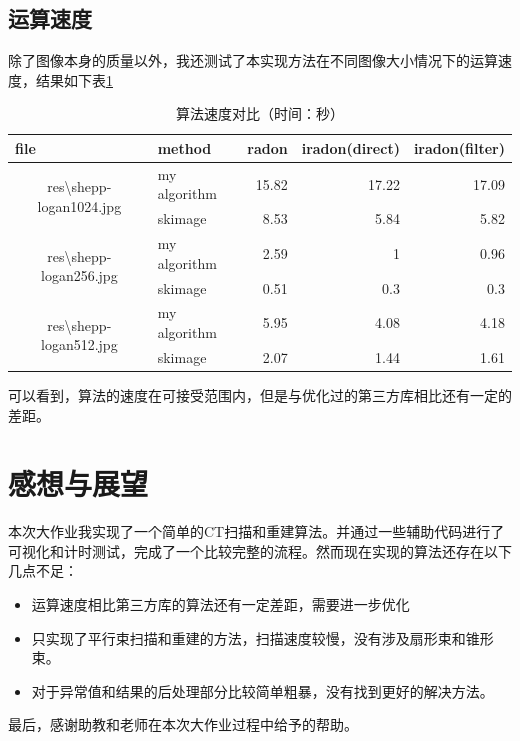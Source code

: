 \documentclass[UTF8]{ctexart}
\begin{document}
\subsection{运算速度}
除了图像本身的质量以外，我还测试了本实现方法在不同图像大小情况下的运算速度，结果如下表\ref{tab:time_cost}
\begin{table}[htbp]
    \centering
    \caption{算法速度对比（时间：秒）}
      \begin{tabular}{clrrr}
      \toprule
      \multicolumn{1}{l}{file} & method & \multicolumn{1}{l}{radon} & \multicolumn{1}{l}{iradon(direct)} & \multicolumn{1}{l}{iradon(filter)} \\
      \midrule
      \multirow{2}[0]{*}{res\textbackslash{}shepp-logan1024.jpg} & my algorithm & 15.82 & 17.22 & 17.09 \\
            & skimage & 8.53  & 5.84  & 5.82 \\
      \multirow{2}[0]{*}{res\textbackslash{}shepp-logan256.jpg} & my algorithm & 2.59  & 1     & 0.96 \\
            & skimage & 0.51  & 0.3   & 0.3 \\
      \multirow{2}[0]{*}{res\textbackslash{}shepp-logan512.jpg} & my algorithm & 5.95  & 4.08  & 4.18 \\
            & skimage & 2.07  & 1.44  & 1.61 \\
      \bottomrule
      \end{tabular}%
    \label{tab:time_cost}%
  \end{table}%
可以看到，算法的速度在可接受范围内，但是与优化过的第三方库相比还有一定的差距。
  
    
\section{感想与展望}

本次大作业我实现了一个简单的CT扫描和重建算法。并通过一些辅助代码进行了可视化和计时测试，完成了一个比较完整的流程。然而现在实现的算法还存在以下几点不足：
\begin{itemize}
    \item 运算速度相比第三方库的算法还有一定差距，需要进一步优化
    \item 只实现了平行束扫描和重建的方法，扫描速度较慢，没有涉及扇形束和锥形束。
    \item 对于异常值和结果的后处理部分比较简单粗暴，没有找到更好的解决方法。
\end{itemize}

最后，感谢助教和老师在本次大作业过程中给予的帮助。


\end{document}
